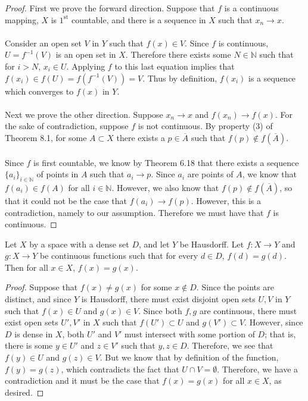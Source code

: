 \documentclass[letter,12pt,twoside]{hmcpset}
\begin{document}
\begin{proof}   
    First we prove the forward direction. Suppose that $f$ is a continuous
    mapping, $X$ is $1^{\text{st}}$ countable, and there is a sequence in $X$
    such that $x_n \rightarrow x$.
    \\
    \\
    Consider an open set $V$ in $Y$ such that $f(x) \in V$. Since $f$ 
    is continuous, $U = f^{-1}(V)$ is an open set in $X$. Therefore there 
    exists some $N \in \mathbb{N}$ such that for $i > N$, $x_i \in U$.
    Applying $f$ to this last equation implies that $f(x_i) \in f(U)
    = f(f^{-1}(V)) = V$. Thus by definition, $f(x_i)$ is a sequence which 
    converges to $f(x)$ in $Y$.
    \\
    \\
    Next we prove the other direction. Suppose $x_n \rightarrow x$
    and $f(x_n) \rightarrow f(x)$. For the sake of contradiction, suppose 
    $f$ is not continuous. By property (3) of Theorem 8.1, for some $A \subset
    X$ there exists a $p \in \overline{A}$ such that $f(p) \notin
    f(\overline{A})$.
    \\
    \\
    Since $f$ is first countable, we know by Theorem 6.18 that 
    there exists a sequence $\{a_i\}_{i \in \mathbb{N}}$ of 
    points in $A$ such that $a_i \rightarrow p$. Since $a_i$ are points
    of $A$, we know that $f(a_i) \in f(A)$ for all $i \in \mathbb{N}$. 
    However, we also know that $f(p) \notin f(\overline{A})$, so that it 
    could not be the case that $f(a_i) \rightarrow f(p)$. However, 
    this is a contradiction, namely to our assumption. Therefore we must 
    have that $f$ is continuous. 
    
\end{proof}

\begin{problem}[Theorem 8.7]
    Let $X$ by a space with a dense set $D$, and let $Y$ be Hausdorff. Let 
    $f: X \rightarrow Y$ and $g: X \rightarrow Y$ be continuous functions such 
    that for every $d \in D$, $f(d) = g(d).$ Then for all $x \in X$, $f(x) = g(x).$    
\end{problem}

\begin{proof}
    Suppose that $f(x) \ne g(x)$ for some $x \notin D$. Since the points are
    distinct, and since $Y$ is Hausdorff, there must exist disjoint open sets 
    $U, V$ in $Y$ such that $f(x) \in U$ and $g(x) \in V$. Since both $f, g$ are
    continuous, there must exist open sets $U', V'$ in $X$ such that 
    $f(U') \subset U$ and $g(V') \subset V$. However, since $D$ is dense in $X$,
    both $U'$ and $V'$ must intersect with some portion of $D$; that is, 
    there is some $y \in U'$ and $z \in V'$ such that $y, z \in D$. Therefore, 
    we see that $f(y) \in U$ and $g(z) \in V$. But we know that by definition of
    the function, $f(y) = g(z)$, which contradicts the fact that $U \cap V =
    \emptyset.$ Therefore, we have a contradiction and it must be the case that 
    $f(x) = g(x)$ for all $x \in X$, as desired.
\end{proof}
\end{document}
